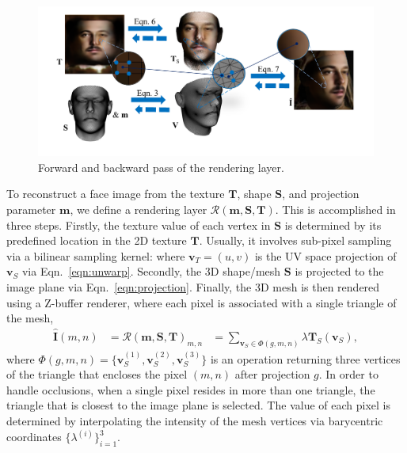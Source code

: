 \label{sec:rendering}

\begin{figure}[t!]
\centering
\includegraphics[trim=39 30 35 0,clip, width=0.9\linewidth]{img/Rendering.png}
\vspace{-3mm}
\caption{\small Forward and backward pass of the rendering layer.}
\label{fig:structure}
\figvspace 
\end{figure}

To reconstruct a face image from the texture $\mathbf{T}$, shape $\mathbf{S}$, and projection parameter $\mathbf{m}$, we define a rendering layer $\mathcal{R}(\mathbf{m},\mathbf{S},\mathbf{T})$. %
This is accomplished in three steps. 
Firstly, the texture value of each vertex in $\mathbf{S}$ is determined by its predefined location in the 2D texture $\mathbf{T}$. 
Usually, it involves sub-pixel sampling via a bilinear sampling kernel:
\noindent {}
where $\mathbf{v}_T = (u, v)$ is the UV space projection of $\mathbf{v}_S$ via Eqn.~\ref{eqn:unwarp}.
Secondly, the 3D shape/mesh $\mathbf{S}$ is projected to the image plane via Eqn.~\ref{eqn:projection}.
Finally, the 3D mesh is then rendered using a Z-buffer renderer, where each pixel is associated with a single triangle of the mesh,
\begin{align}
\mathbf{\hat{I}}(m, n) & = \mathcal{R}(\mathbf{m},\mathbf{S}, \mathbf{T})_{m,n}  &= \! \! \! \sum_{\mathbf{v}_S \in \Phi(g, m, n) } \! \! \! \lambda \mathbf{T}_S(\mathbf{v}_S), 
\end{align}
where $\Phi(g, m, n) = \{\mathbf{v}_S ^{(1)}, \mathbf{v}_S ^{(2)}, \mathbf{v}_S^{(3)} \}$ is an operation returning three vertices of the triangle that encloses the pixel $(m, n)$ after projection $g$. 
In order to handle occlusions, when a single pixel resides in more than one triangle, the triangle that is closest to the image plane is selected. 
The value of each pixel is determined by interpolating the intensity of the mesh vertices via barycentric coordinates $\{\lambda^{(i)}\}_{i=1}^3$.

